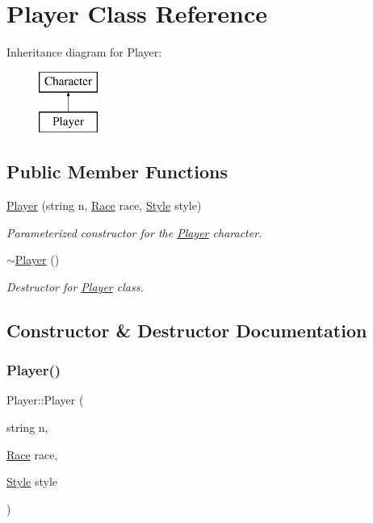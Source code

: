\hypertarget{class_player}{}\section{Player Class Reference}
\label{class_player}
Inheritance diagram for Player\+:\begin{figure}[H]
\begin{center}
\leavevmode
\includegraphics[height=2.000000cm]{class_player}
\end{center}
\end{figure}
\subsection*{Public Member Functions}
\begin{DoxyCompactItemize}
\item 
\mbox{\hyperlink{class_player_abec01f069e1d50cd743180a649a8f1bd}{Player}} (string n, \mbox{\hyperlink{class_race}{Race}} race, \mbox{\hyperlink{class_style}{Style}} style)
\begin{DoxyCompactList}\small\item\em Parameterized constructor for the \mbox{\hyperlink{class_player}{Player}} character. \end{DoxyCompactList}\item 
\mbox{\label{class_player_a749d2c00e1fe0f5c2746f7505a58c062}} 
\mbox{\hyperlink{class_player_a749d2c00e1fe0f5c2746f7505a58c062}{$\sim$\+Player}} ()
\begin{DoxyCompactList}\small\item\em Destructor for \mbox{\hyperlink{class_player}{Player}} class. \end{DoxyCompactList}\end{DoxyCompactItemize}


\subsection{Constructor \& Destructor Documentation}
\mbox{\label{class_player_abec01f069e1d50cd743180a649a8f1bd}} 
\subsubsection{\texorpdfstring{Player()}{Player()}}
{\footnotesize\ttfamily Player\+::\+Player (\begin{DoxyParamCaption}\item[{string}]{n,  }\item[{\mbox{\hyperlink{class_race}{Race}}}]{race,  }\item[{\mbox{\hyperlink{class_style}{Style}}}]{style }\end{DoxyParamCaption})}



